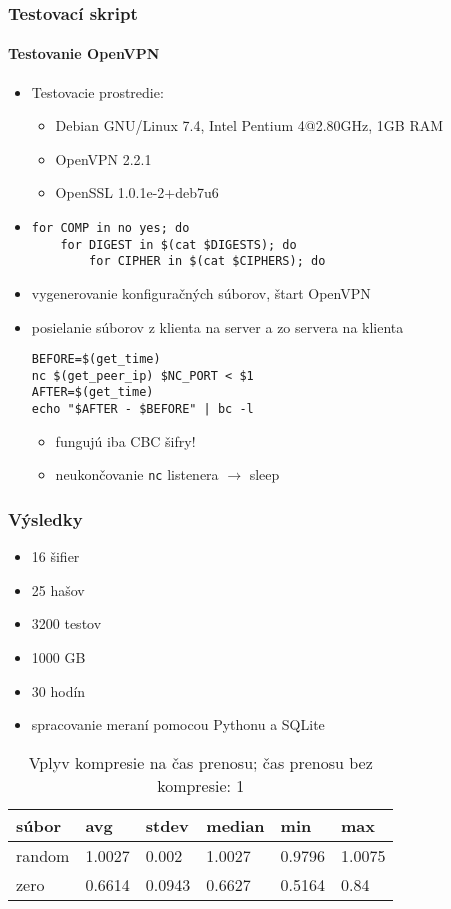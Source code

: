 \documentclass{beamer}
\begin{document}
\begin{frame}[fragile]
	\frametitle{Testovací skript}
	\framesubtitle{Testovanie OpenVPN}
	\begin{itemize}
		\item Testovacie prostredie:
			\begin{itemize}
				\item Debian GNU/Linux 7.4, Intel Pentium 4@2.80GHz, 1GB RAM
				\item OpenVPN 2.2.1
				\item OpenSSL 1.0.1e-2+deb7u6
			\end{itemize}
		\item
{\small
\begin{verbatim}
for COMP in no yes; do
    for DIGEST in $(cat $DIGESTS); do
        for CIPHER in $(cat $CIPHERS); do
\end{verbatim}
}
		\item vygenerovanie konfiguračných súborov, štart OpenVPN
		\item posielanie súborov z klienta na server a zo servera na klienta
{\tiny
\begin{verbatim}
BEFORE=$(get_time)
nc $(get_peer_ip) $NC_PORT < $1
AFTER=$(get_time)
echo "$AFTER - $BEFORE" | bc -l
\end{verbatim}
}
			\begin{itemize} 
				\item fungujú iba CBC šifry!
				\item neukončovanie \texttt{nc} listenera $\rightarrow$ sleep
			\end{itemize}	

	\end{itemize}
\end{frame}

\begin{frame}
	\frametitle{Výsledky}
	\begin{itemize}
		\item 16 šifier
		\item 25 hašov
		\item 3200 testov
		\item 1000 GB
		\item 30 hodín
		\item spracovanie meraní pomocou Pythonu a SQLite
	\end{itemize}
	\begin{table}
		\begin{tabular}{|l||l|l|l|l|l|}
			\hline
			\bf súbor & \bf  avg & \bf stdev & \bf median & \bf min & \bf max \\ \hline 
			random & 1.0027 & 0.002 & 1.0027 & 0.9796 & 1.0075 \\ \hline
			zero & 0.6614 & 0.0943 & 0.6627 & 0.5164 & 0.84\\ \hline
		\end{tabular}
		\caption{Vplyv kompresie na čas prenosu; čas prenosu bez kompresie: 1}
	\end{table}
\end{frame}
\end{document}
